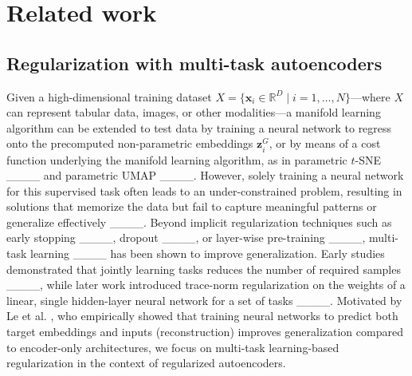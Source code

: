 \section{Related work}
\subsection{Regularization with multi-task autoencoders}\label{subsec:multitask_autoencoders}
Given a high-dimensional training dataset \( X = \{\mathbf{x}_i \in \mathbb{R}^D \mid i = 1, \hdots, N\} \)—where \( X \) can represent tabular data, images, or other modalities—a manifold learning algorithm can be extended to test data by training a neural network to regress onto the precomputed non-parametric embeddings $\mathbf{z}_i^G$, or by means of a cost function underlying the manifold learning algorithm, as in parametric  $t$-SNE ____ and parametric UMAP ____. However, solely training a neural network for this supervised task often leads to an under-constrained problem, resulting in solutions that memorize the data but fail to capture meaningful patterns or generalize effectively ____. Beyond implicit regularization techniques such as early stopping ____, dropout ____, or layer-wise pre-training ____, multi-task learning ____ has been shown to improve generalization. Early studies demonstrated that jointly learning tasks reduces the number of required samples ____, while later work introduced trace-norm regularization on the weights of a linear, single hidden-layer neural network for a set of tasks ____. Motivated by Le et al. , who empirically showed that training neural networks to predict both target embeddings and inputs (reconstruction) improves generalization compared to encoder-only architectures, we focus on multi-task learning-based regularization in the context of regularized autoencoders.

